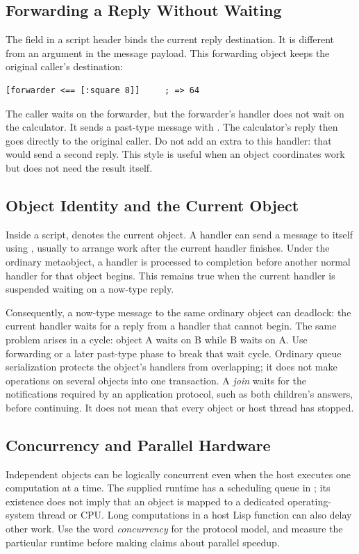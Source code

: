 \subsection{Forwarding a Reply Without Waiting}

The  field in a script header binds the current reply destination.
It is different from an argument in the message payload.
This forwarding object keeps the original caller's destination:


\begin{lstlisting}
[forwarder <== [:square 8]]     ; => 64
\end{lstlisting}

The caller waits on the forwarder, but the forwarder's handler does not
wait on the calculator. It sends a past-type message with .
The calculator's reply then goes directly to the original caller.
Do not add an extra \code{!} to this handler: that would send a second reply.
This style is useful when an object coordinates work but does not need
the result itself.

\subsection{Object Identity and the Current Object}

Inside a script,  denotes the current object.
A handler can send a message to itself using \code{[Me <= message]},
usually to arrange work after the current handler finishes.
Under the ordinary metaobject, a handler is processed to completion before
another normal handler for that object begins. This remains true when
the current handler is suspended waiting on a now-type reply.

Consequently, a now-type message to the same ordinary object can deadlock:
the current handler waits for a reply from a handler that cannot begin.
The same problem arises in a cycle: object A waits on B while B waits on A.
Use forwarding or a later past-type phase to break that wait cycle.
Ordinary queue serialization protects the object's handlers from overlapping;
it does not make operations on several objects into one transaction.
A \emph{join} waits for the notifications required by an application
protocol, such as both children's answers, before continuing. It does
not mean that every object or host thread has stopped.

\subsection{Concurrency and Parallel Hardware}

Independent objects can be logically concurrent even when the host executes
one computation at a time. The supplied runtime has a scheduling queue
in ; its existence does not imply that an object
is mapped to a dedicated operating-system thread or CPU.
Long computations in a host Lisp function can also delay other work.
Use the word \emph{concurrency} for the protocol model, and measure the
particular runtime before making claims about parallel speedup.
